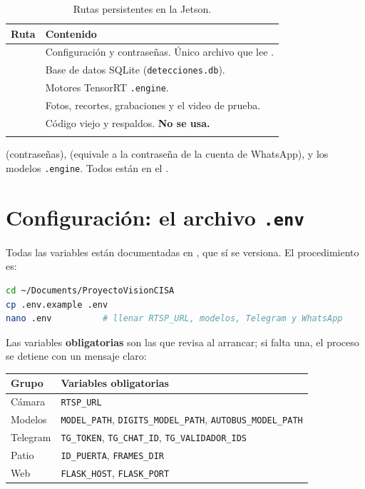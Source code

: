 \begin{longtable}{@{}L{4.5cm}L{10cm}@{}}
  \toprule
  \textbf{Ruta} & \textbf{Contenido} \\
  \midrule
  \endhead
   & Configuración y contraseñas. Único archivo que lee
    . \\
   & Base de datos SQLite (\texttt{detecciones.db}). \\
   & Motores TensorRT \texttt{.engine}. \\
   & Fotos, recortes, grabaciones y
    el video de prueba. \\
   & Código viejo y respaldos. \textbf{No se usa.} \\
  \bottomrule
  \caption{Rutas persistentes en la Jetson.}
  \label{tab:rutas}
\end{longtable}

\begin{peligro}[title={Lo que nunca se sube a Git}]
 (contraseñas),  (equivale a la contraseña de
la cuenta de WhatsApp),  y los modelos \texttt{.engine}. Todos
están en el .
\end{peligro}

\section{Configuración: el archivo \texttt{.env}}

Todas las variables están documentadas en , que sí se
versiona. El procedimiento es:

\begin{lstlisting}[language=bash, caption={Preparar la configuración},
                   label={lst:env}]
cd ~/Documents/ProyectoVisionCISA
cp .env.example .env
nano .env          # llenar RTSP_URL, modelos, Telegram y WhatsApp
\end{lstlisting}

Las variables \textbf{obligatorias} son las que  revisa al
arrancar; si falta una, el proceso se detiene con un mensaje claro:

\begin{center}
\begin{tabular}{@{}ll@{}}
  \toprule
  \textbf{Grupo} & \textbf{Variables obligatorias} \\
  \midrule
  Cámara & \texttt{RTSP\_URL} \\
  Modelos & \texttt{MODEL\_PATH}, \texttt{DIGITS\_MODEL\_PATH},
            \texttt{AUTOBUS\_MODEL\_PATH} \\
  Telegram & \texttt{TG\_TOKEN}, \texttt{TG\_CHAT\_ID}, \texttt{TG\_VALIDADOR\_IDS} \\
  Patio & \texttt{ID\_PUERTA}, \texttt{FRAMES\_DIR} \\
  Web & \texttt{FLASK\_HOST}, \texttt{FLASK\_PORT} \\
  \bottomrule
\end{tabular}
\end{center}

